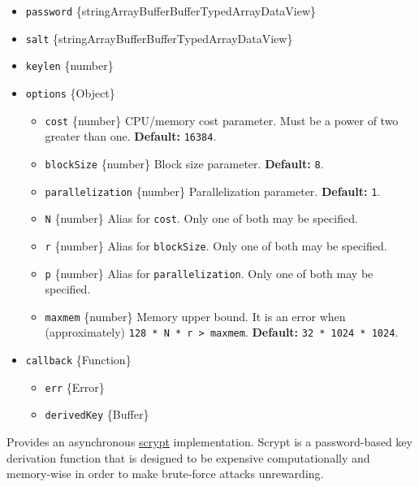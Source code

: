 \begin{itemize}
\tightlist
\item
  \texttt{password}
  \{string\textbar ArrayBuffer\textbar Buffer\textbar TypedArray\textbar DataView\}
\item
  \texttt{salt}
  \{string\textbar ArrayBuffer\textbar Buffer\textbar TypedArray\textbar DataView\}
\item
  \texttt{keylen} \{number\}
\item
  \texttt{options} \{Object\}

  \begin{itemize}
  \tightlist
  \item
    \texttt{cost} \{number\} CPU/memory cost parameter. Must be a power
    of two greater than one. \textbf{Default:} \texttt{16384}.
  \item
    \texttt{blockSize} \{number\} Block size parameter.
    \textbf{Default:} \texttt{8}.
  \item
    \texttt{parallelization} \{number\} Parallelization parameter.
    \textbf{Default:} \texttt{1}.
  \item
    \texttt{N} \{number\} Alias for \texttt{cost}. Only one of both may
    be specified.
  \item
    \texttt{r} \{number\} Alias for \texttt{blockSize}. Only one of both
    may be specified.
  \item
    \texttt{p} \{number\} Alias for \texttt{parallelization}. Only one
    of both may be specified.
  \item
    \texttt{maxmem} \{number\} Memory upper bound. It is an error when
    (approximately) \texttt{128\ *\ N\ *\ r\ \textgreater{}\ maxmem}.
    \textbf{Default:} \texttt{32\ *\ 1024\ *\ 1024}.
  \end{itemize}
\item
  \texttt{callback} \{Function\}

  \begin{itemize}
  \tightlist
  \item
    \texttt{err} \{Error\}
  \item
    \texttt{derivedKey} \{Buffer\}
  \end{itemize}
\end{itemize}

Provides an asynchronous
\href{https://en.wikipedia.org/wiki/Scrypt}{scrypt} implementation.
Scrypt is a password-based key derivation function that is designed to
be expensive computationally and memory-wise in order to make
brute-force attacks unrewarding.

